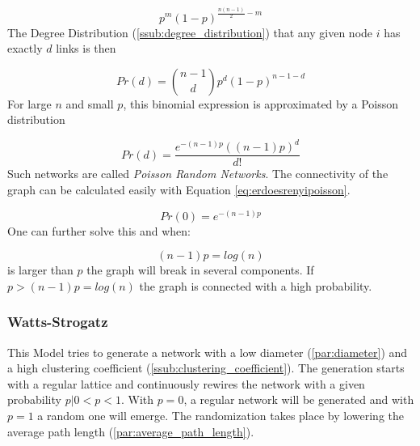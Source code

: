 \begin{equation}
\label{eq:erdoesrenyiprob}
	p^m (1 - p)^{\frac{n(n-1)}{2}-m}
\end{equation}
The Degree Distribution (\ref{ssub:degree_distribution})
that any given node $i$ has exactly $d$ links is then

\begin{equation}
\label{eq:erdoesrenyidegreedist}
	Pr(d) = \binom{n-1}{d} p^d(1-p)^{n-1-d}
\end{equation}
For large $n$ and small $p$,
this binomial expression is approximated by a Poisson distribution

\begin{equation}
\label{eq:erdoesrenyipoisson}
	Pr(d) = \frac{e^{-(n-1)p}((n-1)p)^d}{d!}
\end{equation}
Such networks are called \emph{Poisson Random Networks}.
The connectivity of the graph can be calculated easily with Equation \ref{eq:erdoesrenyipoisson}.

\begin{equation}
	Pr(0) = e^{-(n-1)p}
\end{equation}
One can further solve this and when:

\begin{equation}
	(n-1)p= log (n)
\end{equation}
is larger than $p$ the graph will break in several components.
If $p > (n-1)p= log (n)$ the graph is connected with a high probability.

\subsubsection{Watts-Strogatz} %
\label{ssub:watts_strogatz}
This Model tries to generate a network with a low diameter (\ref{par:diameter})
and a high clustering coefficient (\ref{ssub:clustering_coefficient}).
The generation starts with a regular lattice
and continuously rewires the network with a given probability $p | 0<p<1$.
With $p = 0$, a regular network will be generated
and with $p = 1$ a random one will emerge.
The randomization takes place by lowering the average path length (\ref{par:average_path_length}).


